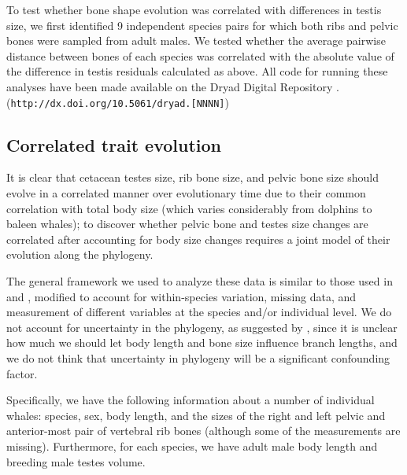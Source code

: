 \documentclass[12pt]{article}
\newcommand{\href}[2]{#2 (\texttt{#1})}
\begin{document}
To test whether bone shape evolution was correlated with differences in testis
size, we first identified 9 independent species pairs for which both ribs and pelvic bones
were sampled from adult males. We tested whether the average pairwise distance
between bones of each species was correlated with the absolute value of the difference
in testis residuals calculated as above. All code for running these analyses have been
made available on the Dryad Digital Repository
\href{http://dx.doi.org/10.5061/dryad.[NNNN]}.



\subsection*{Correlated trait evolution}

It is clear that cetacean testes size, rib bone size, and pelvic bone size
should evolve in a correlated manner over evolutionary time
due to their common correlation with total body size 
(which varies considerably from dolphins to baleen whales);
to discover whether pelvic bone and testes size changes are correlated
after accounting for body size changes
requires a joint model of their evolution along the phylogeny.

The general framework we used to analyze these data is similar to those used in \citet{revell2009phylogenetic} and \citet{harmon2008geiger},
modified to account for within-species variation,
missing data,
and measurement of different variables at the species and/or individual level.
We do not account for uncertainty in the phylogeny,
as suggested by \citet{huelsenbeck2003detecting},
since it is unclear how much we should let body length and bone size influence branch lengths,
and we do not think that uncertainty in phylogeny will be a significant confounding factor.

Specifically, we have the following information about a number of individual whales:
species, sex, body length,
and the sizes of the right and left pelvic and anterior-most pair of vertebral rib bones
(although some of the measurements are missing).
Furthermore, for each species, we have
adult male body length and
breeding male testes volume.
\end{document}
